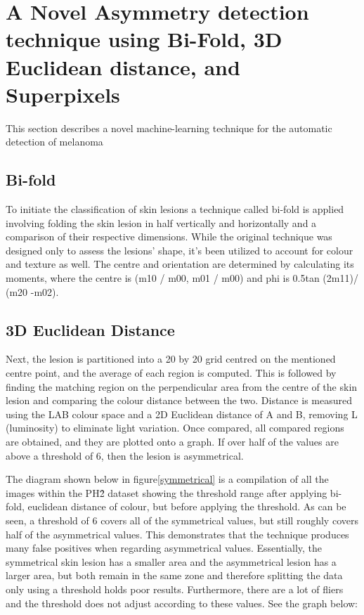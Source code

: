 \section{A Novel Asymmetry detection technique using Bi-Fold, 3D Euclidean distance, and Superpixels}
This section describes a novel machine-learning technique for the automatic detection of melanoma

\subsection{Bi-fold}
To initiate the classification of skin lesions a technique called bi-fold is applied involving folding the skin lesion in half vertically and horizontally and a comparison of their respective dimensions. While the original technique was designed only to assess the lesions' shape, it's been utilized to account for colour and texture as well. The centre and orientation are determined by calculating its moments, where the centre is (m10 / m00, m01 / m00) and phi is 0.5tan (2m11)/ (m20 -m02).


\subsection{3D Euclidean Distance}
Next, the lesion is partitioned into a 20 by 20 grid centred on the mentioned centre point, and the average of each region is computed. This is followed by finding the matching region on the perpendicular area from the centre of the skin lesion and comparing the colour distance between the two. Distance is measured using the LAB colour space and a 2D Euclidean distance of A and B, removing L (luminosity) to eliminate light variation. Once compared, all compared regions are obtained, and they are plotted onto a graph. If over half of the values are above a threshold of 6, then the lesion is asymmetrical.

The diagram shown below in figure\ref{symmetrical} is a compilation of all the images within the PH\^2 dataset showing the threshold range after applying bi-fold, euclidean distance of colour, but before applying the threshold. As can be seen, a threshold of 6 covers all of the symmetrical values, but still roughly covers half of the asymmetrical values. This demonstrates that the technique produces many false positives when regarding asymmetrical values.
Essentially, the symmetrical skin lesion has a smaller area and the asymmetrical lesion has a larger area, but both remain in the same zone and therefore splitting the data only using a threshold holds poor results. Furthermore, there are a lot of fliers and the threshold does not adjust according to these values. See the graph below:

